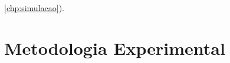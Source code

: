 \ref{chp:simulacao}). 

\section{Metodologia Experimental}
\label{chp:metodologiaexperimental}












 \newpage



\subsection{}

\subsubsection{}

\subsubsection{}





\subsubsection{}





 \newpage



\subsection{}







	
	

\subsection{}
\label{chp:moldagem}






				




